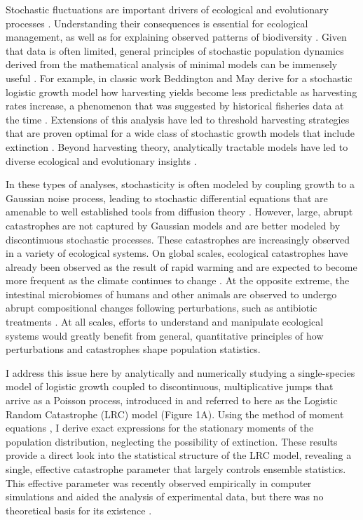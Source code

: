 Stochastic fluctuations are important drivers of ecological and evolutionary processes \cite{levins1968evolution,landeBook,melbingerSREP_2015,fisher2014transition}.  Understanding their consequences is essential for ecological management, as well as for explaining observed patterns of biodiversity \cite{landeBook}.  Given that data is often limited, general principles of stochastic population dynamics derived from the mathematical analysis of minimal models can be immensely useful  \cite{landeBook,hastings2016timescales}.  For example, in classic work  \cite{beddington1977harvesting} Beddington and May derive for a stochastic logistic growth model how harvesting yields become less predictable as harvesting rates increase, a phenomenon that was suggested by historical fisheries data at the time \cite{schaefer1957study}.  Extensions of this analysis have led to threshold harvesting strategies that are proven optimal for a wide class of stochastic growth models that include extinction \cite{lande1995optimal}.  Beyond harvesting theory, analytically tractable models have led to diverse ecological and evolutionary insights \cite{levins1968evolution,melbingerSREP_2015,dickens2016analytically}.

In these types of analyses, stochasticity is often modeled by coupling growth to a Gaussian noise process, leading to stochastic differential equations that are amenable to well established tools from diffusion theory \cite{landeBook,karlin1981second}.  However, large, abrupt catastrophes are not captured by Gaussian models and are better modeled by discontinuous stochastic processes.  These catastrophes are increasingly observed in a variety of ecological systems.  On global scales, ecological catastrophes have already been observed as the result of rapid warming and are expected to become more frequent as the climate continues to change \cite{pershing2015slow}.  At the opposite extreme, the intestinal microbiomes of humans and other animals are observed to undergo abrupt compositional changes following perturbations, such as antibiotic treatments \cite{trosvik2015biotic, caporaso2011moving, relmanABX_2011,wiles_host_2016}.  At all scales, efforts to understand and manipulate ecological systems would greatly benefit from general, quantitative principles of how perturbations and catastrophes shape population statistics.

I address this issue here by  analytically and numerically studying a single-species model of logistic growth coupled to discontinuous, multiplicative jumps that arrive as a Poisson process, introduced in \cite{hanson1981} and referred to here as the Logistic Random Catastrophe (LRC) model (Figure 1A). Using the method of moment equations \cite{bover1978moment}, I derive exact expressions for the stationary moments of the population distribution, neglecting the possibility of extinction.  These results provide a direct look into the statistical structure of the LRC model, revealing a single, effective catastrophe parameter that largely controls ensemble statistics.  This effective parameter was recently observed empirically in computer simulations and aided the analysis of experimental data, but there was no theoretical basis for its existence \cite{wiles_host_2016}.  

